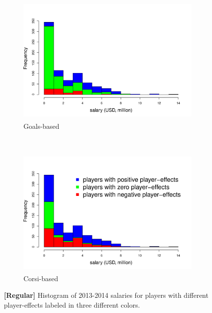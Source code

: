 \begin{figure}[htb!]
	\centering
	\begin{subfigure}[t]{0.5\textwidth}
		\centering
		\includegraphics[height=2.5in]{figures/salaryhist-1314-goals-regular.pdf}
		\caption{Goals-based}
	\end{subfigure}%
	~ 
	\begin{subfigure}[t]{0.5\textwidth}
		\centering
		\includegraphics[height=2.5in]{figures/salaryhist-1314-corsi-regular.pdf}
		\caption{Corsi-based}
	\end{subfigure}
	\caption{\textbf{[Regular]} Histogram of 2013-2014 salaries for players with different player-effects labeled in three different colors.}
\end{figure}


